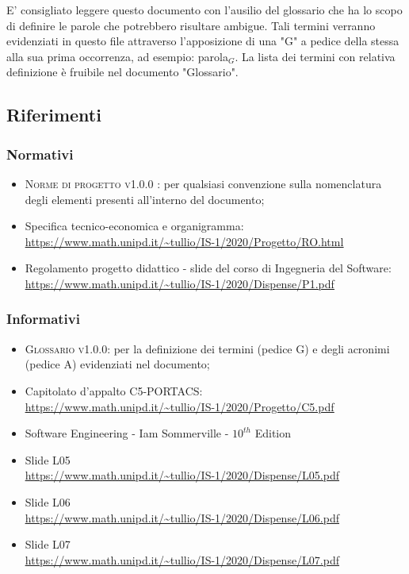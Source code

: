 E' consigliato leggere questo documento con l'ausilio del glossario che ha lo scopo di definire le parole che potrebbero risultare ambigue. Tali termini verranno evidenziati in questo file attraverso l'apposizione di una "G" a pedice della stessa alla sua prima occorrenza, ad esempio: parola$_G$.
La lista dei termini con relativa definizione è fruibile nel documento "Glossario".




\subsection{Riferimenti}



\subsubsection{Normativi}

\begin{itemize}
	\item \textsc{Norme di progetto v1.0.0 }: per qualsiasi convenzione sulla nomenclatura degli elementi presenti all’interno del documento;
	\item Specifica tecnico-economica e organigramma: \\  \uline{\url{https://www.math.unipd.it/~tullio/IS-1/2020/Progetto/RO.html}} %
	\item Regolamento progetto didattico - slide del corso di Ingegneria del Software: \\ \uline{\url{https://www.math.unipd.it/~tullio/IS-1/2020/Dispense/P1.pdf}}
\end{itemize}



\subsubsection{Informativi}
\begin{itemize}
	\item \textsc{Glossario v1.0.0}: per la definizione dei termini (pedice G) e degli acronimi (pedice A) evidenziati nel documento;
	\item Capitolato d'appalto C5-PORTACS: \\
	\uline{\url{https://www.math.unipd.it/~tullio/IS-1/2020/Progetto/C5.pdf}}
	\item Software Engineering - Iam Sommerville - $10^{th}$ Edition
	\item Slide L05 \\
	\uline{\url{https://www.math.unipd.it/~tullio/IS-1/2020/Dispense/L05.pdf}}%
	\item Slide L06 \\
	\uline{\url{https://www.math.unipd.it/~tullio/IS-1/2020/Dispense/L06.pdf}}%
	\item Slide L07 \\
	\uline{\url{https://www.math.unipd.it/~tullio/IS-1/2020/Dispense/L07.pdf}}%
\end{itemize}